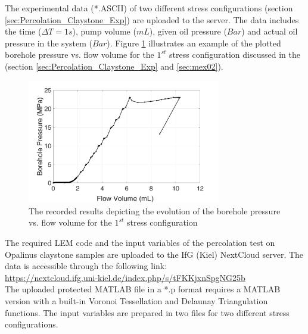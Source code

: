 The experimental data (*.ASCII) of two different stress configurations (section \ref{sec:Percolation_Claystone_Exp}) are uploaded to the server. The data includes the time ($\Delta T=1s$), pump volume ($mL$), given oil pressure ($Bar$) and actual oil pressure in the system ($Bar$). Figure \ref{fig:Amir_Percolation_Flow_a_Data}
illustrates an example of the plotted borehole pressure vs. flow volume for the $1^{st}$ stress configuration discussed in the (section \ref{sec:Percolation_Claystone_Exp} and \ref{sec:mex02}).

\begin{figure}[!ht]
\centering
\includegraphics[width=0.75\textwidth]{figures/Amir_Percolation_Flow_a_Data.png}
\caption{The recorded results depicting the evolution of the borehole pressure vs. flow volume for the $1^{st}$ stress configuration}
\label{fig:Amir_Percolation_Flow_a_Data}
\end{figure}


The required LEM code and the input variables of the percolation test on Opalinus claystone samples are uploaded to the IfG (Kiel) NextCloud server. The data is accessible through the following link:\\
\hyperlink{https://nextcloud.ifg.uni-kiel.de/index.php/s/tFKKjxnSpgNG25b}{https://nextcloud.ifg.uni-kiel.de/index.php/s/tFKKjxnSpgNG25b}\\

The uploaded protected MATLAB file in a *.p format requires a MATLAB version with a built-in Voronoi Tessellation and Delaunay Triangulation functions. The input variables are prepared in two files for two different stress configurations.


